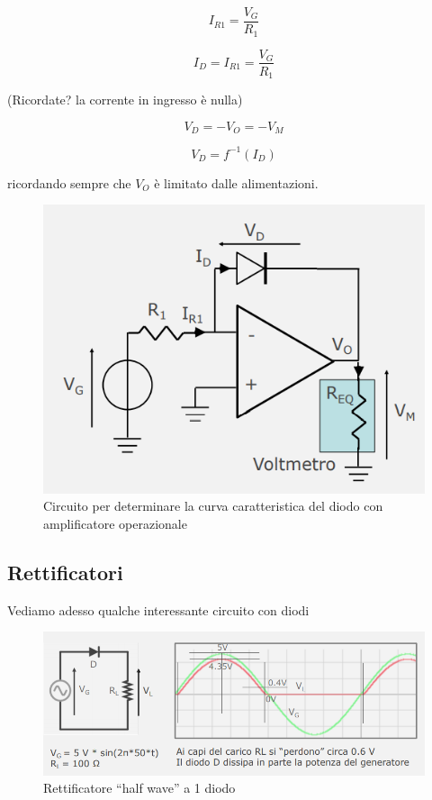 \documentclass{article}
\begin{document}
\[I_{R1} = \frac{V_G}{R_1}\]

\[I_D = I_{R1} = \frac{V_G}{R_1}\]

(Ricordate? la corrente in ingresso è nulla)

\[V_D = - V_O = -V_M\]

\[V_D = f^{-1} (I_D)\]

ricordando sempre che $V_O$ è limitato dalle alimentazioni.

\begin{figure}[h]
  \centering
  \includegraphics[scale=0.55]{IM_diodo_misura_ter}
  \caption{Circuito per determinare la curva caratteristica del diodo con amplificatore operazionale}
  \label{Schema_diodo_misura_ter}
\end{figure}


\clearpage













\subsection{Rettificatori}

Vediamo adesso qualche interessante circuito con diodi

\begin{figure}[h]
  \centering
  \includegraphics[scale=0.6]{IM_rettificatore_half_wave}
  \caption{Rettificatore ``half wave'' a 1 diodo}
  \label{Schema_rettificatore_half_wave}
\end{figure}
\end{document}
